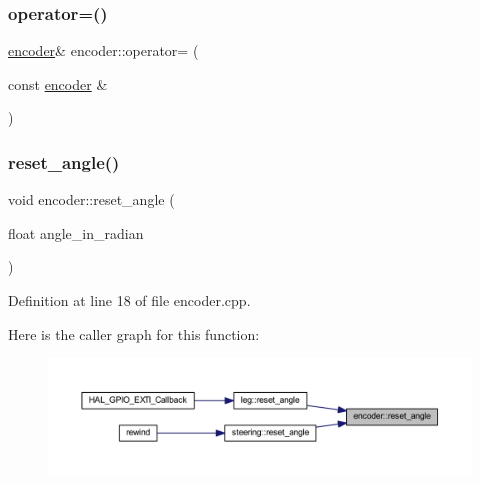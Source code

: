 \subsubsection{\texorpdfstring{operator=()}{operator=()}\hspace{0.1cm}{\footnotesize\ttfamily [2/2]}}
{\footnotesize\ttfamily \mbox{\hyperlink{classencoder}{encoder}}\& encoder\+::operator= (\begin{DoxyParamCaption}\item[{const \mbox{\hyperlink{classencoder}{encoder}} \&}]{ }\end{DoxyParamCaption})\hspace{0.3cm}{\ttfamily [default]}}

\mbox{\label{classencoder_af37dc5bf8a2323a500dd55f5fef12afb}} 
\subsubsection{\texorpdfstring{reset\_angle()}{reset\_angle()}}
{\footnotesize\ttfamily void encoder\+::reset\+\_\+angle (\begin{DoxyParamCaption}\item[{float}]{angle\+\_\+in\+\_\+radian }\end{DoxyParamCaption})}



Definition at line 18 of file encoder.\+cpp.

Here is the caller graph for this function\+:
\nopagebreak
\begin{figure}[H]
\begin{center}
\leavevmode
\includegraphics[width=350pt]{classencoder_af37dc5bf8a2323a500dd55f5fef12afb_icgraph}
\end{center}
\end{figure}
\mbox{\label{classencoder_afb36996f08db7f27e2df5334f90c8e53}} 
